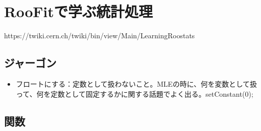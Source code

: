 
\chapter{RooFitで学ぶ統計処理}
https://twiki.cern.ch/twiki/bin/view/Main/LearningRoostats
\section{ジャーゴン}
\begin{itemize}
  \item フロートにする：定数として扱わないこと。MLEの時に、何を変数として扱って、何を定数として固定するかに関する話題でよく出る。setConstant(0);
\end{itemize}
\section{関数}

